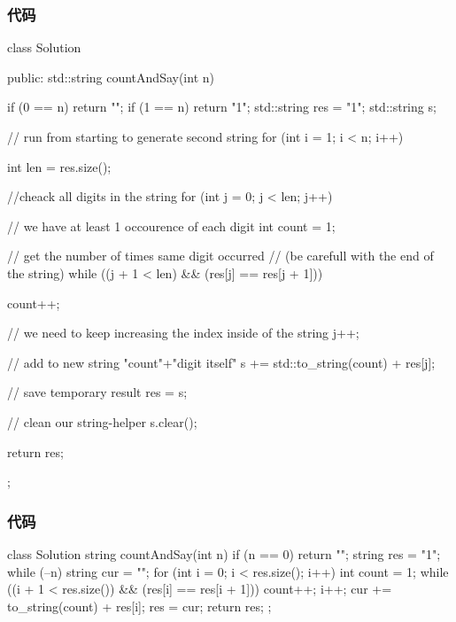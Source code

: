 \subsubsection{代码}
\begin{Code}
class Solution {
public:
    std::string countAndSay(int n) {
        if (0 == n) return "";
        if (1 == n) return "1";
        std::string res = "1";
        std::string s;
        
        // run from starting to generate second string
        for (int i = 1; i < n; i++) {
            int len = res.size();
            
            //cheack all digits in the string
            for (int j = 0; j < len; j++) {
            
                // we have at least 1 occourence of each digit
                int count = 1;
                
                // get the number of times same digit occurred
                // (be carefull with the end of the string)
                while ((j + 1 < len) && (res[j] == res[j + 1])) {
                    count++;
                    
                    // we need to keep increasing the index inside of the string
                    j++;
                }
                
                // add to new string "count"+"digit itself"
                s += std::to_string(count) + res[j];
            }
            
            // save temporary result
            res = s;
            
            // clean our string-helper
            s.clear();
        }
        return res;
    }
};
\end{Code}

\subsubsection{代码}
\begin{Code}
class Solution {
    string countAndSay(int n) {
        if (n == 0) return "";
        string res = "1";
        while (--n) {
            string cur = "";
            for (int i = 0; i < res.size(); i++) {
                int count = 1;
                while ((i + 1 < res.size()) && (res[i] == res[i + 1])) {
                    count++;
                    i++;
                }
                cur += to_string(count) + res[i];
            }
            res = cur;
        }
        return res;
    }
};
\end{Code}



